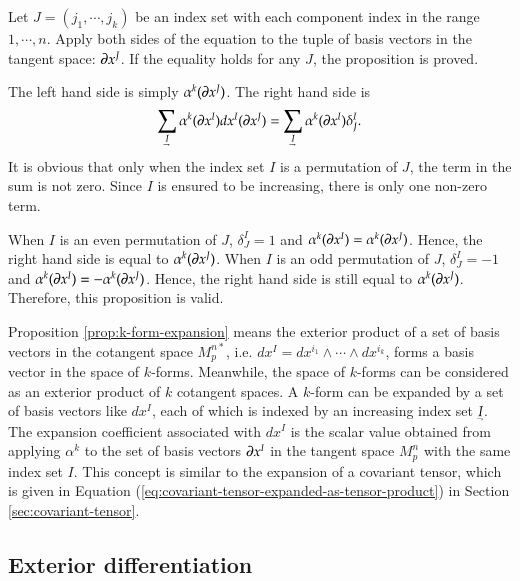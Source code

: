 \documentclass[11pt, a4paper]{book}
\begin{document}
\begin{Proof}
  Let $J = (j_1,\cdots,j_k)$ be an index set with each component index in the range
  $1,\cdots,n$. Apply both sides of the equation to the tuple of basis vectors in the
  tangent space: $\boldsymbol{\partial}x^J$. If the equality holds for any $J$, the proposition is
  proved.

  The left hand side is simply $\alpha^k(\boldsymbol{\partial}x^J)$. The right hand side is
  \begin{equation}
    \sum_{\underaccent{\rightharpoondown}{I}}\alpha^k(\vect{\pdiff}x^I)dx^I(\vect{\pdiff}x^J)
    = \sum_{\underaccent{\rightharpoondown}{I}} \alpha^k(\vect{\pdiff}x^I)\delta_J^I.
  \end{equation}
  It is obvious that only when the index set $I$ is a permutation of $J$, the term in the
  sum is not zero. Since $I$ is ensured to be increasing, there is only one non-zero term.

  When $I$ is an even permutation of $J$, $\delta_J^I=1$ and
  $\alpha^k(\boldsymbol{\partial}x^I) = \alpha^k(\boldsymbol{\partial}x^J)$. Hence, the right hand side is
  equal to $\alpha^k(\boldsymbol{\partial}x^J)$. When $I$ is an odd permutation of $J$,
  $\delta_J^I=-1$ and $\alpha^k(\boldsymbol{\partial}x^I) = -\alpha^k(\boldsymbol{\partial}x^J)$. Hence,
  the right hand side is still equal to $\alpha^k(\boldsymbol{\partial}x^J)$. Therefore, this
  proposition is valid.
\end{Proof}

Proposition \ref{prop:k-form-expansion} means the exterior product of a set of basis
vectors in the cotangent space $M_p^{n*}$, i.e.
$dx^I = dx^{i_1}\wedge\cdots\wedge dx^{i_k}$, forms a basis vector in the space of
$k$-forms. Meanwhile, the space of $k$-forms can be considered as an exterior product of
$k$ cotangent spaces. A $k$-form can be expanded by a set of basis vectors like $dx^I$,
each of which is indexed by an increasing index set $\underaccent{\rightharpoondown}{I}$.
The expansion coefficient associated with $dx^I$ is the scalar value obtained from
applying $\alpha^k$ to the set of basis vectors $\boldsymbol{\partial}x^I$ in the tangent space
$M_p^n$ with the same index set $I$. This concept is similar to the expansion of a
covariant tensor, which is given in Equation
(\ref{eq:covariant-tensor-expanded-as-tensor-product}) in Section
\ref{sec:covariant-tensor}.

\subsection{Exterior differentiation}
\end{document}
